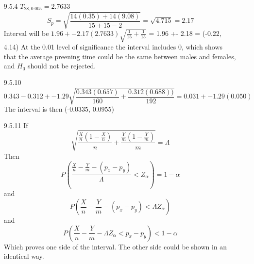 \documentclass[11pt,fleqn]{article}
\begin{document}
\begin{enumerate}
  \item[9.5.4]
  $T_{28,0.005} = 2.7633$
  \[
  S_p = \sqrt{\frac{14(0.35) + 14(9.08)}{15+15-2}} = \sqrt{4.715} = 2.17
  \]
  Interval will be $1.96+- 2.17(2.7633)\sqrt{\frac{1}{15}+\frac{1}{15}}$ =
  1.96 +- 2.18 = (-0.22, 4.14)
  At the 0.01 level of significance the interval includes 0, which shows that
  the average preening time could be the same between males and females, and
  $H_0$ should not be rejected. 
  \item[9.5.10]
  \[
  0.343 - 0.312 +- 1.29\sqrt{\frac{0.343(0.657)}{160} +
  \frac{0.312(0.688))}{192}} = 0.031 +- 1.29(0.050)
  \]
  The interval is then (-0.0335, 0.0955)
  \item[9.5.11]
  If 
  \[
  \sqrt{\frac{\frac{X}{n}(1-\frac{X}{n})}{n} +
  \frac{\frac{Y}{m}(1-\frac{Y}{m})}{m}} = \Lambda
  \]
  Then
  \[
  P(\frac{\frac{X}{n}-\frac{Y}{m} - (p_x-p_y)}{\Lambda} < Z_\alpha) = 1 - \alpha 
  \]
  and
  \[
  P(\frac{X}{n}-\frac{Y}{m} - (p_x-p_y) < \Lambda Z_\alpha)
  \]
  and
  \[
  P(\frac{X}{n}-\frac{Y}{m} - \Lambda Z_\alpha < p_x - p_y) < 1-\alpha
  \]
  Which proves one side of the interval. The other side could be shown in an
  identical way. 
\end{enumerate}
\end{document}
